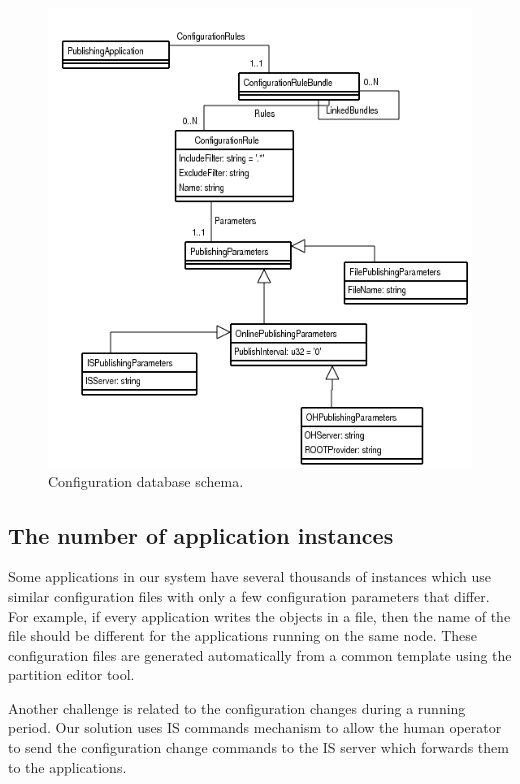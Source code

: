 \begin{figure}[ht]
\centering
\includegraphics[scale=0.75]{../Images/oks_schema.png}
\caption{Configuration database schema.}
\label{fig:oks_schema}
\end{figure}

\subsection*{The number of application instances}

Some applications in our system have several thousands of instances which use similar configuration files with only a few configuration parameters that differ. For example, if every application writes the objects in a file, then the name of the file should be different for the applications running on the same node. These configuration files are generated automatically from a common template using the partition editor tool.

Another challenge is related to the configuration changes during a running period. Our solution uses IS commands mechanism to allow the human operator to send the configuration change commands to the IS server which forwards them to the applications.